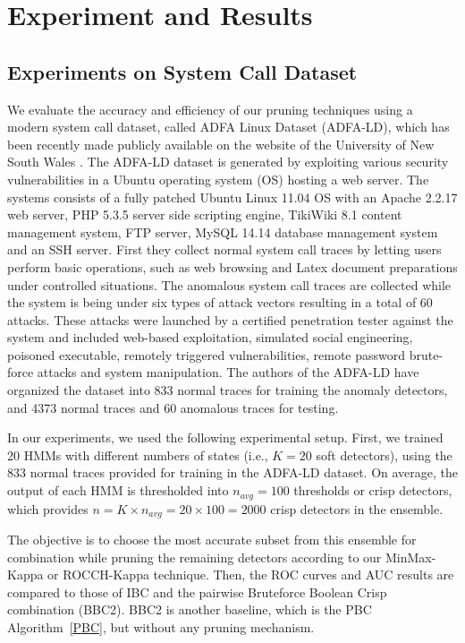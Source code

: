 \chapter{Experiment and Results} \label{chapter4}

\section{Experiments on System Call Dataset}
\label{sec:experiments}

We evaluate the accuracy and efficiency of our pruning techniques using a modern system call dataset, called ADFA Linux Dataset (ADFA-LD), which has been recently made publicly available on the website of the University of New South Wales \cite{Creech2013a}.
The ADFA-LD dataset is generated by exploiting various security vulnerabilities in a Ubuntu operating system (OS) hosting a web server.
The systems consists of a fully patched Ubuntu Linux 11.04 OS with an Apache 2.2.17 web server, PHP 5.3.5 server side scripting engine, TikiWiki 8.1 content management system, FTP server, MySQL 14.14 database management system and an SSH server.
First they collect normal system call traces by letting users perform basic operations, such as web browsing and Latex document preparations under controlled situations.
The anomalous system call traces are collected while the system is being under six types of attack vectors resulting in a total of 60 attacks.
These attacks were launched by a certified penetration tester against the system and included web-based exploitation, simulated social engineering, poisoned executable, remotely triggered vulnerabilities, remote password brute-force attacks and system manipulation.
The authors of the ADFA-LD have organized the dataset into 833 normal traces for training the anomaly detectors, and 4373 normal traces and 60 anomalous traces for testing.

In our experiments, we used the following experimental setup.
First, we trained 20 HMMs with different numbers of states (i.e., $K=20$ soft detectors), using the 833 normal traces provided for training in the ADFA-LD dataset.
On average, the output of each HMM is thresholded into $n_{avg} = 100$ thresholds or crisp detectors, which provides $n = K \times n_{avg} = 20\times 100 =2000$ crisp detectors in the ensemble.

The objective is to choose the most accurate subset from this ensemble for combination while pruning the remaining detectors according to our MinMax-Kappa or ROCCH-Kappa technique.
Then, the ROC curves and AUC results are compared to those of IBC and the pairwise Bruteforce Boolean Crisp combination (BBC2).
BBC2 is another baseline, which is the PBC Algorithm~\ref{PBC}, but without any pruning mechanism.

